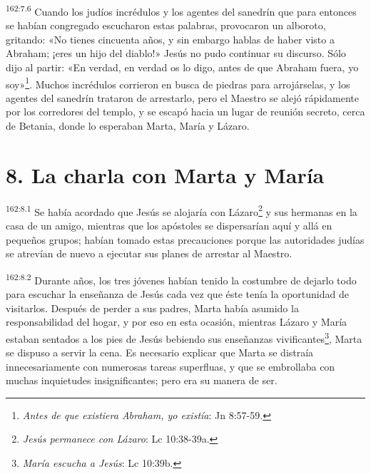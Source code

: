 \par
\textsuperscript{162:7.6} Cuando los judíos incrédulos y los agentes del sanedrín que para entonces se habían congregado escucharon estas palabras, provocaron un alboroto, gritando: «No tienes cincuenta años, y sin embargo hablas de haber visto a Abraham; ¡eres un hijo del diablo!» Jesús no pudo continuar su discurso. Sólo dijo al partir: «En verdad, en verdad os lo digo, antes de que Abraham fuera, yo soy»\footnote{\textit{Antes de que existiera Abraham, yo existía}: Jn 8:57-59.}. Muchos incrédulos corrieron en busca de piedras para arrojárselas, y los agentes del sanedrín trataron de arrestarlo, pero el Maestro se alejó rápidamente por los corredores del templo, y se escapó hacia un lugar de reunión secreto, cerca de Betania, donde lo esperaban Marta, María y Lázaro.

\section*{8. La charla con Marta y María}
\par
\textsuperscript{162:8.1} Se había acordado que Jesús se alojaría con Lázaro\footnote{\textit{Jesús permanece con Lázaro}: Lc 10:38-39a.} y sus hermanas en la casa de un amigo, mientras que los apóstoles se dispersarían aquí y allá en pequeños grupos; habían tomado estas precauciones porque las autoridades judías se atrevían de nuevo a ejecutar sus planes de arrestar al Maestro.

\par
\textsuperscript{162:8.2} Durante años, los tres jóvenes habían tenido la costumbre de dejarlo todo para escuchar la enseñanza de Jesús cada vez que éste tenía la oportunidad de visitarlos. Después de perder a sus padres, Marta había asumido la responsabilidad del hogar, y por eso en esta ocasión, mientras Lázaro y María estaban sentados a los pies de Jesús bebiendo sus enseñanzas vivificantes\footnote{\textit{María escucha a Jesús}: Lc 10:39b.}, Marta se dispuso a servir la cena. Es necesario explicar que Marta se distraía innecesariamente con numerosas tareas superfluas, y que se embrollaba con muchas inquietudes insignificantes; pero era su manera de ser.

